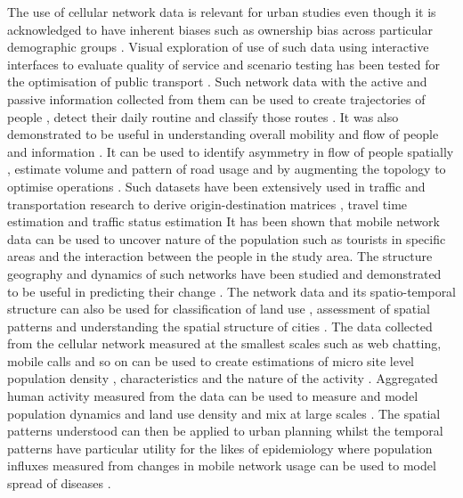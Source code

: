 The use of cellular network data is relevant for urban studies \citep{jiang2013,steenbruggen2015, lokanathan2015, calabrese2015, reades2007} even though it is acknowledged to have inherent biases such as ownership bias across particular demographic groups \citep{wesolowski2013}.
Visual exploration of use of such data using interactive interfaces to evaluate quality of service and scenario testing has been tested for the optimisation of public transport \cite{sbodio2014}.
Such network data with the active and passive information collected from them can be used to create trajectories of people \citep{schlaich2010}, detect their daily routine \citep{sevtsuk2010} and classify those routes \citep{becker2011a}.
It was also demonstrated to be useful in understanding overall mobility and flow of people and information \citep{candia2008, krings2009, simini2012, zhang2019new}.
It can be used to identify asymmetry in flow of people spatially \citep{phithakkitnukoon2011}, estimate volume and pattern of road usage \citep{bolla2000, wang2012} and by augmenting the topology to optimise operations \citep{puzis2013}.
Such datasets have been extensively used in traffic and transportation research to derive origin-destination matrices \citep{caceres2007, mellegard2011, iqbal2014}, travel time estimation \citep{janecek2012} and traffic status estimation \citep{demissie2013, grauwin2015}        
It has been shown that mobile network data can be used to uncover nature of the population such as tourists in specific areas \citep{girardin2008} and the interaction between the people in the study area.
The structure \citep{onnela2007 a, b} geography \citep{lambiotte2008} and dynamics \citep{hidalgo2008} of such networks have been studied and demonstrated to be useful in predicting their change \citep{wang2011}.
The network data and its spatio-temporal structure can also be used for classification of land use \citep{pei2014}, assessment of spatial patterns \citep{reades2009, steenbruggen2013} and understanding the spatial structure of cities \citep{louail2014, arribas-bel2015}.
The data collected from the cellular network measured at the smallest scales such as web chatting, mobile calls and so on can be used to create estimations of micro site level population density \citep{pulselli2008}, characteristics \citep{girardin2009} and the nature of the activity \citep{phithakkitnukoon2010}.
Aggregated human activity measured from the data can be used to measure and model population dynamics and land use density and mix at large scales \citep{jacobs-crisioni2014, tranos2015,2018}.
The spatial patterns understood can then be applied to urban planning \citep{becker2011b} whilst the temporal patterns have particular utility for the likes of epidemiology where population influxes measured from changes in mobile network usage can be used to model spread of diseases \citep{buckee2015}.

